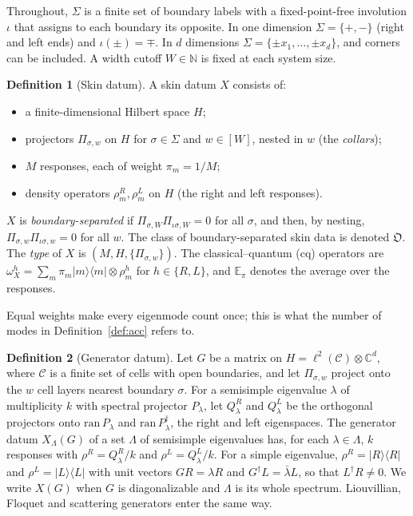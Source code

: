 \documentclass[11pt]{article}
\theoremstyle{definition}
\newtheorem{definition}{Definition}
\theoremstyle{remark}
\newcommand{\E}{\mathbb{E}}
\newcommand{\proj}[1]{|#1\rangle\!\langle #1|}
\newcommand{\Obj}{\mathfrak{O}}
\newcommand{\isig}{\iota\sigma}
\begin{document}
Throughout, $\Sigma$ is a finite set of boundary labels with a fixed-point-free involution $\iota$ that assigns to each boundary its opposite. In one dimension $\Sigma=\{+,-\}$ (right and left ends) and $\iota(\pm)=\mp$. In $d$ dimensions $\Sigma=\{\pm x_1,\dots,\pm x_d\}$, and corners can be included. A width cutoff $W\in\mathbb N$ is fixed at each system size.

\begin{definition}[Skin datum]\label{def:object}
A skin datum $X$ consists of:
\begin{itemize}
\item a finite-dimensional Hilbert space $H$;
\item projectors $\Pi_{\sigma,w}$ on $H$ for $\sigma\in\Sigma$ and $w\in[W]$, nested in $w$ (the \emph{collars});
\item $M$ responses, each of weight $\pi_m=1/M$;
\item density operators $\rho^R_m,\rho^L_m$ on $H$ (the right and left responses).
\end{itemize}
$X$ is \emph{boundary-separated} if $\Pi_{\sigma,W}\Pi_{\isig,W}=0$ for all $\sigma$, and then, by nesting, $\Pi_{\sigma,w}\Pi_{\isig,w}=0$ for all $w$. The class of boundary-separated skin data is denoted $\Obj$. The \emph{type} of $X$ is $(M,H,\{\Pi_{\sigma,w}\})$. The classical--quantum (cq) operators are $\omega^h_X=\sum_m\pi_m\proj m\otimes\rho^h_m$ for $h\in\{R,L\}$, and $\E_\pi$ denotes the average over the responses.
\end{definition}

Equal weights make every eigenmode count once; this is what the number of modes in Definition~\ref{def:acc} refers to.

\begin{definition}[Generator datum]\label{def:generator}
Let $G$ be a matrix on $H=\ell^2(\mathcal C)\otimes\mathbb C^{d}$, where $\mathcal C$ is a finite set of cells with open boundaries, and let $\Pi_{\sigma,w}$ project onto the $w$ cell layers nearest boundary $\sigma$. For a semisimple eigenvalue $\lambda$ of multiplicity $k$ with spectral projector $P_\lambda$, let $Q^R_\lambda$ and $Q^L_\lambda$ be the orthogonal projectors onto $\mathrm{ran}\,P_\lambda$ and $\mathrm{ran}\,P_\lambda^\dagger$, the right and left eigenspaces. The generator datum $X_\Lambda(G)$ of a set $\Lambda$ of semisimple eigenvalues has, for each $\lambda\in\Lambda$, $k$ responses with $\rho^R=Q^R_\lambda/k$ and $\rho^L=Q^L_\lambda/k$. For a simple eigenvalue, $\rho^R=\proj R$ and $\rho^L=\proj L$ with unit vectors $GR=\lambda R$ and $G^\dagger L=\bar\lambda L$, so that $L^\dagger R\ne0$. We write $X(G)$ when $G$ is diagonalizable and $\Lambda$ is its whole spectrum. Liouvillian, Floquet and scattering generators enter the same way.
\end{definition}
\end{document}
